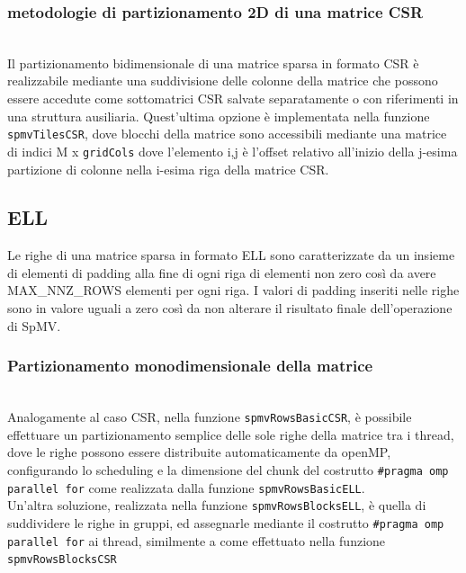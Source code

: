 \documentclass[acmsmall,nonacm=true]{acmart}
\newcommand{\vvv}[1]{{\small\texttt{#1}}}
\begin{document}
\subsubsection{metodologie di partizionamento 2D di una matrice CSR}\hfill\\ %
Il partizionamento bidimensionale di una matrice sparsa in formato CSR è
realizzabile mediante una suddivisione delle colonne della matrice che possono essere
accedute come sottomatrici CSR salvate separatamente \label{spmvTilesAllocdCSR}
o con riferimenti in una struttura ausiliaria. 
Quest'ultima opzione è implementata nella funzione \vvv{spmvTilesCSR}, dove blocchi 
della matrice sono accessibili mediante una matrice di indici M x \vvv{gridCols}
dove l'elemento i,j è l'offset relativo all'inizio della j-esima partizione di
colonne nella i-esima riga della matrice CSR.\\

\subsection{ELL}
Le righe di una matrice sparsa in formato ELL sono caratterizzate da un insieme 
di elementi di padding alla fine di ogni riga di elementi non zero 
così da avere MAX\_NNZ\_ROWS elementi per ogni riga.
I valori di padding inseriti nelle righe sono in valore uguali a zero così da non alterare
il risultato finale dell'operazione di SpMV. 

\subsubsection{Partizionamento monodimensionale della matrice}\hfill\\	%
\label{spmvRowsBasicELL} \label{spmvRowsBlocksELL} 
Analogamente al caso CSR, nella funzione \vvv{spmvRowsBasicCSR}, 
è possibile effettuare un partizionamento semplice delle sole righe della matrice 
tra i thread, dove le righe possono essere distribuite automaticamente da openMP, 
configurando lo scheduling e la dimensione del chunk
del costrutto \vvv{\#pragma omp parallel for} 
come realizzata dalla funzione \vvv{spmvRowsBasicELL}.\\

Un'altra soluzione, realizzata nella funzione \vvv{spmvRowsBlocksELL},
è quella di suddividere le righe in gruppi, ed assegnarle mediante  
il costrutto \vvv{\#pragma omp parallel for} ai thread, similmente a come effettuato
nella funzione \vvv{spmvRowsBlocksCSR}
\end{document}
